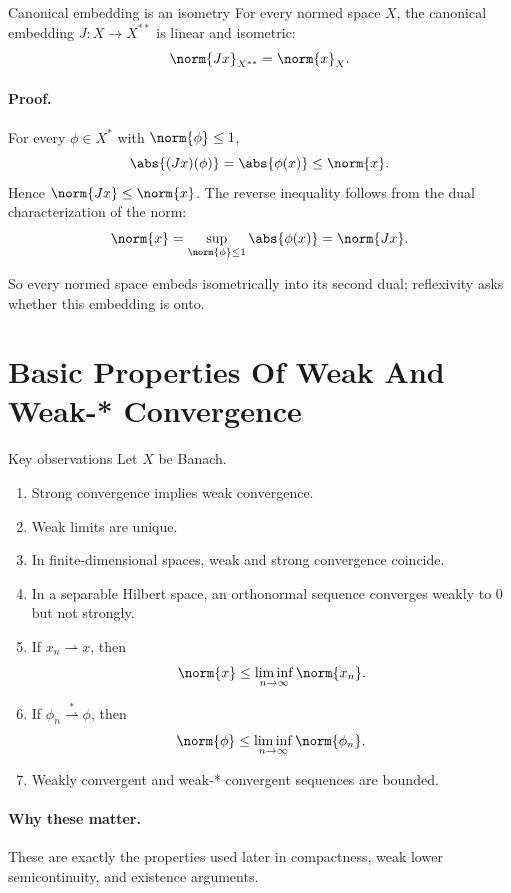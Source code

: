 \documentclass[11pt]{article}
\begin{document}
\begin{thmbox}{Canonical embedding is an isometry}
For every normed space $X$, the canonical embedding $J:X\to X^{**}$ is linear and isometric:
\[
\norm{Jx}_{X^{**}}=\norm{x}_X.
\]
\end{thmbox}

\paragraph{Proof.}
For every $\phi\in X^*$ with $\norm{\phi}\le 1$,
\[
\abs{(Jx)(\phi)}=\abs{\phi(x)}\le \norm{x}.
\]
Hence $\norm{Jx}\le \norm{x}$. The reverse inequality follows from the dual characterization of the norm:
\[
\norm{x}=\sup_{\norm{\phi}\le 1}\abs{\phi(x)}=\norm{Jx}.
\]

\begin{focusbox}
So every normed space embeds isometrically into its second dual; reflexivity asks whether this embedding is onto.
\end{focusbox}

\section{Basic Properties Of Weak And Weak-* Convergence}

\begin{thmbox}{Key observations}
Let $X$ be Banach.
\begin{enumerate}
\item Strong convergence implies weak convergence.
\item Weak limits are unique.
\item In finite-dimensional spaces, weak and strong convergence coincide.
\item In a separable Hilbert space, an orthonormal sequence converges weakly to $0$ but not strongly.
\item If $x_n\rightharpoonup x$, then
\[
\norm{x}\le \liminf_{n\to\infty}\norm{x_n}.
\]
\item If $\phi_n\overset{*}{\rightharpoonup}\phi$, then
\[
\norm{\phi}\le \liminf_{n\to\infty}\norm{\phi_n}.
\]
\item Weakly convergent and weak-* convergent sequences are bounded.
\end{enumerate}
\end{thmbox}

\paragraph{Why these matter.}
These are exactly the properties used later in compactness, weak lower semicontinuity, and existence arguments.
\end{document}
